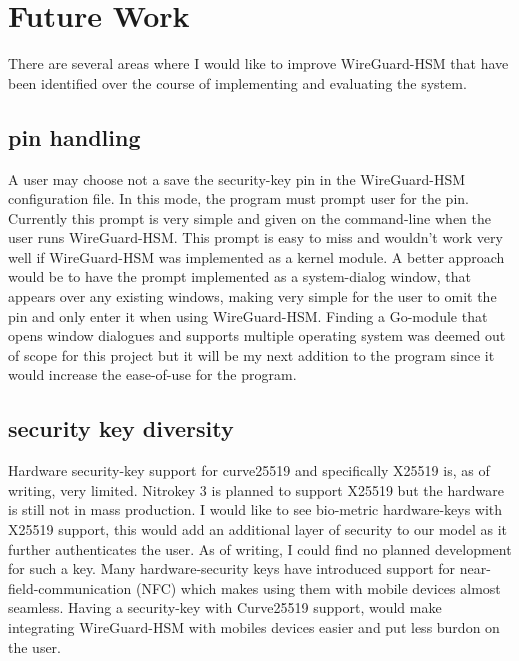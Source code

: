 \documentclass [11pt, proquest] {uwthesis}[2020/02/24]
\begin{document}
\section {Future Work}
There are several areas where I would like to improve WireGuard-HSM that have been identified over the course of implementing and evaluating the system.

\subsection{pin handling}
 A user may choose not a save the security-key pin in the WireGuard-HSM configuration file. In this mode, the program must prompt user for the pin. Currently this prompt is very simple and given on the command-line when the user runs WireGuard-HSM. This prompt is easy to miss and wouldn't work very well if WireGuard-HSM was implemented as a kernel module. A better approach would be to have the prompt implemented as a system-dialog window, that appears over any existing windows, making very simple for the user to omit the pin and only enter it when using WireGuard-HSM. Finding a Go-module that opens window dialogues and supports multiple operating system was deemed out of scope for this project but it will be my next addition to the program since it would increase the ease-of-use for the program. 
 
\subsection{security key diversity}
Hardware security-key support for curve25519 and specifically X25519 is, as of writing, very limited. Nitrokey 3 is planned to support X25519 but the hardware is still not in mass production. I would like to see bio-metric hardware-keys with X25519 support, this would add an additional layer of security to our model as it further authenticates the user. As of writing, I could find no planned development for such a key. Many hardware-security keys have introduced support for near-field-communication (NFC) which makes using them with mobile devices almost seamless. Having a security-key with Curve25519 support, would make integrating WireGuard-HSM with mobiles devices easier and put less burdon on the user. 
\end{document}
